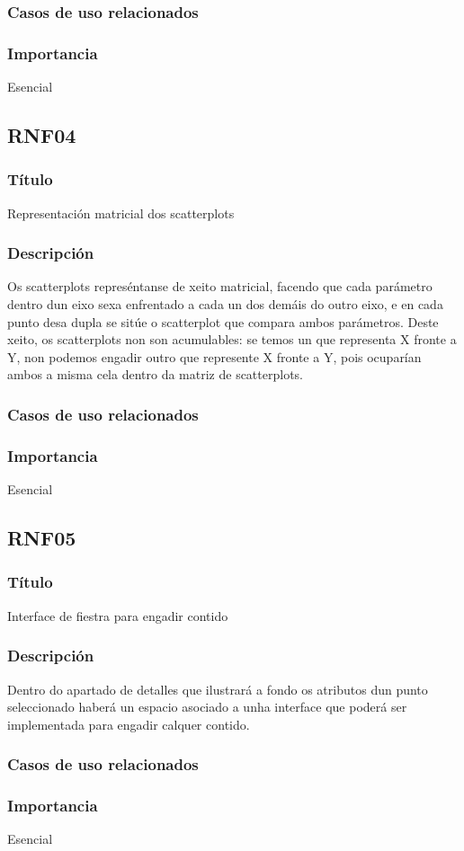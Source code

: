 \subsubsection{Casos de uso relacionados}
\subsubsection{Importancia}
Esencial

\subsection{RNF04}
\subsubsection{Título}
Representación matricial dos scatterplots
\subsubsection{Descripción}
Os scatterplots represéntanse de xeito matricial, facendo que cada parámetro dentro dun eixo sexa enfrentado a cada un dos demáis do outro eixo, e en cada punto desa dupla se sitúe o scatterplot que compara ambos parámetros. Deste xeito, os scatterplots non son acumulables: se temos un que representa X fronte a Y, non podemos engadir outro que represente X fronte a Y, pois ocuparían ambos a misma cela dentro da matriz de scatterplots.
\subsubsection{Casos de uso relacionados}
\subsubsection{Importancia}
Esencial

\subsection{RNF05}
\subsubsection{Título}
Interface de fiestra para engadir contido
\subsubsection{Descripción}
Dentro do apartado de detalles que ilustrará a fondo os atributos dun punto seleccionado haberá un espacio asociado a unha interface que poderá ser implementada para engadir calquer contido.
\subsubsection{Casos de uso relacionados}
\subsubsection{Importancia}
Esencial


